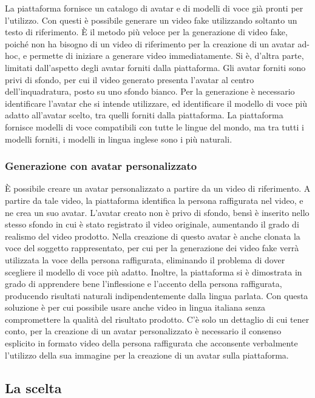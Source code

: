 La piattaforma fornisce un catalogo di avatar e di modelli di voce già pronti per l'utilizzo. Con questi è possibile generare un video fake utilizzando soltanto un testo di riferimento. È il metodo più veloce per la generazione di video fake, poiché non ha bisogno di un video di riferimento per la creazione di un avatar ad-hoc, e permette di iniziare a generare video immediatamente. Si è, d'altra parte, limitati dall'aspetto degli avatar forniti dalla piattaforma. Gli avatar forniti sono privi di sfondo, per cui il video generato presenta l'avatar al centro dell'inquadratura, posto su uno sfondo bianco. Per la generazione è necessario identificare l'avatar che si intende utilizzare, ed identificare il modello di voce più adatto all'avatar scelto, tra quelli forniti dalla piattaforma. La piattaforma fornisce modelli di voce compatibili con tutte le lingue del mondo, ma tra tutti i modelli forniti, i modelli in lingua inglese sono i più naturali.

\subsubsection{Generazione con avatar personalizzato}

È possibile creare un avatar personalizzato a partire da un video di riferimento. A partire da tale video, la piattaforma identifica la persona raffigurata nel video, e ne crea un suo avatar. L'avatar creato non è privo di sfondo, bensì è inserito nello stesso sfondo in cui è stato registrato il video originale, aumentando il grado di realismo del video prodotto. Nella creazione di questo avatar è anche clonata la voce del soggetto rappresentato, per cui per la generazione dei video fake verrà utilizzata la voce della persona raffigurata, eliminando il problema di dover scegliere il modello di voce più adatto. Inoltre, la piattaforma si è dimostrata in grado di apprendere bene l'inflessione e l'accento della persona raffigurata, producendo risultati naturali indipendentemente dalla lingua parlata. Con questa soluzione è per cui possibile usare anche video in lingua italiana senza compromettere la qualità del risultato prodotto. C'è solo un dettaglio di cui tener conto, per la creazione di un avatar personalizzato è necessario il consenso esplicito in formato video della persona raffigurata che acconsente verbalmente  l'utilizzo della sua immagine per la creazione di un avatar sulla piattaforma.

\subsection{La scelta}


